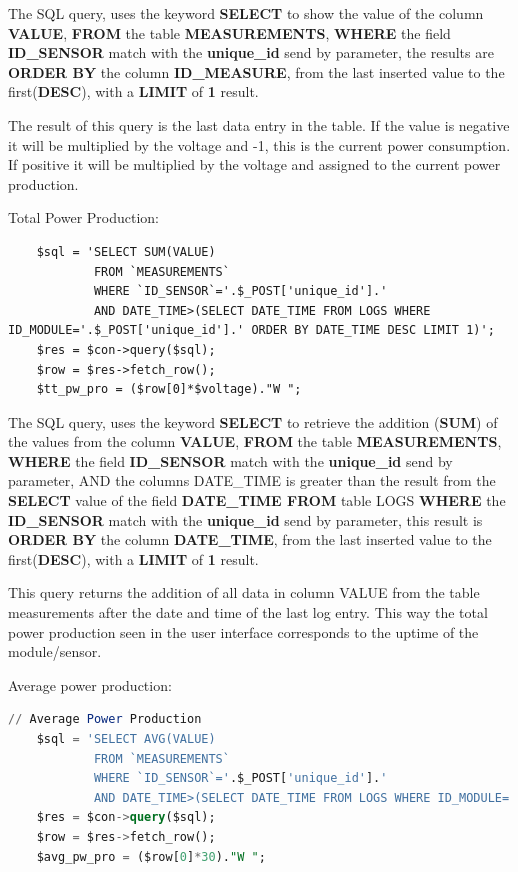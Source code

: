 The SQL query, uses the keyword \textbf{SELECT} to show the value of the column \textbf{VALUE}, \textbf{FROM} the table \textbf{MEASUREMENTS}, \textbf{WHERE} the field \textbf{ID\_SENSOR} match with the \textbf{unique\_id} send by parameter, the results are \textbf{ORDER BY} the column \textbf{ID\_MEASURE}, from the last inserted value to the first(\textbf{DESC}), with a \textbf{LIMIT} of \textbf{1} result.

The result of this query is the last data entry in the table. If the value is negative it will be multiplied by the voltage and -1, this is the current power consumption. If positive it will be multiplied by the voltage and assigned to the current power production.

Total Power Production:
\begin{lstlisting}
	$sql = 'SELECT SUM(VALUE) 
			FROM `MEASUREMENTS` 
			WHERE `ID_SENSOR`='.$_POST['unique_id'].'
			AND DATE_TIME>(SELECT DATE_TIME FROM LOGS WHERE ID_MODULE='.$_POST['unique_id'].' ORDER BY DATE_TIME DESC LIMIT 1)';
	$res = $con->query($sql);
	$row = $res->fetch_row();
	$tt_pw_pro = ($row[0]*$voltage)."W ";
\end{lstlisting}

The SQL query, uses the keyword \textbf{SELECT} to retrieve the addition (\textbf{SUM}) of the values from the column \textbf{VALUE}, \textbf{FROM} the table \textbf{MEASUREMENTS}, \textbf{WHERE} the field \textbf{ID\_SENSOR} match with the \textbf{unique\_id} send by parameter, AND the columns DATE\_TIME is greater than the result from the  \textbf{SELECT} value of the field \textbf{DATE\_TIME FROM} table LOGS \textbf{WHERE} the \textbf{ID\_SENSOR} match with the \textbf{unique\_id} send by parameter, this result is \textbf{ORDER BY} the column \textbf{DATE\_TIME}, from the last inserted value to the first(\textbf{DESC}), with a \textbf{LIMIT} of \textbf{1} result.

This query returns the addition of all data in column VALUE from the table measurements after the date and time of the last log entry. This way the total power production seen in the user interface corresponds to the uptime of the module/sensor.

Average power production:
\begin{lstlisting}[language=sql]
	// Average Power Production
	$sql = 'SELECT AVG(VALUE) 
			FROM `MEASUREMENTS` 
			WHERE `ID_SENSOR`='.$_POST['unique_id'].'
			AND DATE_TIME>(SELECT DATE_TIME FROM LOGS WHERE ID_MODULE='.$_POST['unique_id'].' ORDER BY DATE_TIME DESC LIMIT 1)';
	$res = $con->query($sql);
	$row = $res->fetch_row();
	$avg_pw_pro = ($row[0]*30)."W ";
\end{lstlisting}

